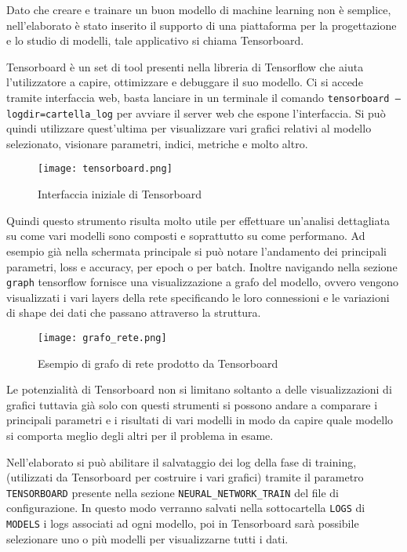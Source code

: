 Dato che creare e trainare un buon modello di machine learning non è semplice, nell’elaborato è stato inserito il supporto di una piattaforma per la progettazione e lo studio di modelli, tale applicativo si chiama Tensorboard.

Tensorboard è un set di tool presenti nella libreria di Tensorflow che aiuta l’utilizzatore a capire, ottimizzare e debuggare il suo modello. Ci si accede tramite interfaccia web, basta lanciare in un terminale il comando \texttt{tensorboard --logdir=cartella\_log} per avviare il server web che espone l’interfaccia. Si può quindi utilizzare quest’ultima per visualizzare vari grafici relativi al modello selezionato, visionare parametri, indici, metriche e molto altro.

\begin{figure}[h]
  \centering
  \texttt{[image: tensorboard.png]}
  \caption{Interfaccia iniziale di Tensorboard}
\end{figure}

Quindi questo strumento risulta molto utile per effettuare un'analisi dettagliata su come vari modelli sono composti e soprattutto su come performano. Ad esempio già nella schermata principale si può notare l’andamento dei principali parametri, loss e accuracy, per epoch o per batch. Inoltre navigando nella sezione \texttt{graph} tensorflow fornisce una visualizzazione a grafo del modello, ovvero vengono visualizzati i vari layers della rete specificando le loro connessioni e le variazioni di shape dei dati che passano attraverso la struttura.

\begin{figure}[H]
  \centering
  \texttt{[image: grafo\_rete.png]}
  \caption{Esempio di grafo di rete prodotto da Tensorboard}
\end{figure}

Le potenzialità di Tensorboard non si limitano soltanto a delle visualizzazioni di grafici tuttavia già solo con questi strumenti si possono andare a comparare i principali parametri e i risultati di vari modelli in modo da capire quale modello si comporta meglio degli altri per il problema in esame.

Nell’elaborato si può abilitare il salvataggio dei log della fase di training, (utilizzati da Tensorboard per costruire i vari grafici) tramite il parametro \texttt{TENSORBOARD} presente nella sezione \texttt{NEURAL\_NETWORK\_TRAIN} del file di configurazione. In questo modo verranno salvati nella sottocartella \texttt{LOGS} di \texttt{MODELS} i logs associati ad ogni modello, poi in Tensorboard sarà possibile selezionare uno o più modelli per visualizzarne tutti i dati.
